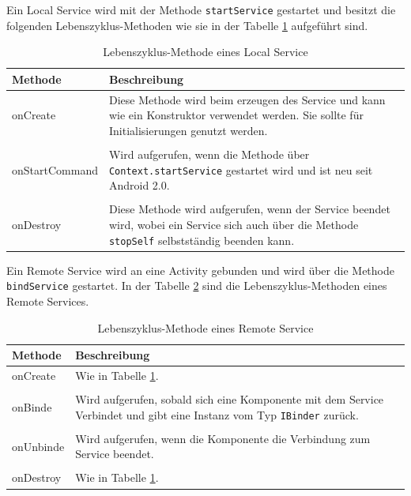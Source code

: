 Ein Local Service wird mit der Methode \texttt{startService} gestartet und besitzt die folgenden Lebenszyklus-Methoden wie sie in der Tabelle \ref{Lebenszyklus-Methode eines Local Service} aufgef\"uhrt sind.

\begin{table}[!ht]
\begin{tabular}{|p{3cm}|p{12cm}|}
 \hline Methode & Beschreibung \\
 \hline onCreate & Diese Methode wird beim erzeugen des Service  und kann wie ein Konstruktor verwendet werden. Sie sollte f\"ur Initialisierungen genutzt werden.\\&\\
 onStartCommand & Wird aufgerufen, wenn die Methode \"uber \texttt{Context.startService} gestartet wird und ist neu seit Android 2.0.\\&\\
 onDestroy & Diese Methode wird aufgerufen, wenn der Service beendet wird, wobei ein Service sich auch \"uber die Methode \texttt{stopSelf} selbstst\"andig beenden kann.\\
 \hline
\end{tabular}
\caption{Lebenszyklus-Methode eines Local Service \cite{Android44}}
\label{Lebenszyklus-Methode eines Local Service}
\end{table}
\FloatBarrier

Ein Remote Service wird an eine Activity gebunden und wird \"uber die Methode \texttt{bindService} gestartet. In der Tabelle \ref{Lebenszyklus-Methode eines Remote Service} sind die Lebenszyklus-Methoden eines Remote Services.

\FloatBarrier
\begin{table}[!ht]
\begin{tabular}{|p{3cm}|p{12cm}|}
 \hline Methode & Beschreibung \\
 \hline onCreate & Wie in Tabelle \ref{Lebenszyklus-Methode eines Local Service}.\\&\\
 onBinde & Wird aufgerufen, sobald sich eine Komponente mit dem Service Verbindet und gibt eine Instanz vom Typ \texttt{IBinder} zur\"uck.\\&\\
 onUnbinde & Wird aufgerufen, wenn die Komponente die Verbindung zum Service beendet.\\&\\
 onDestroy & Wie in Tabelle \ref{Lebenszyklus-Methode eines Local Service}.\\
 \hline
\end{tabular}
\caption{Lebenszyklus-Methode eines Remote Service \cite{Android44}}
\label{Lebenszyklus-Methode eines Remote Service}
\end{table}
\FloatBarrier

